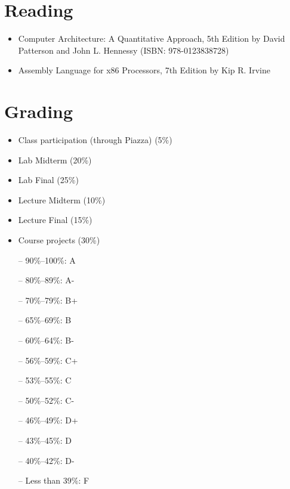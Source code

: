 \documentclass[12pt,a4paper,oneside]{article}
\begin{document}
    \section{Reading}

        \begin{itemize}
            \item Computer Architecture: A Quantitative Approach, 5th Edition by David Patterson and John L. Hennessy (ISBN: 978-0123838728)
            \item Assembly Language for x86 Processors, 7th Edition by Kip R. Irvine
        \end{itemize}

    \section{Grading}

        \begin{itemize}
            \item Class participation (through Piazza) (5\%)
            \item Lab Midterm (20\%)
            \item Lab Final (25\%)
            \item Lecture Midterm (10\%)
            \item Lecture Final (15\%)
            \item Course projects (30\%)
        \end{itemize}

        \begin{itemize} \itemsep-10pt \parskip0pt 
            \item[--] 90\%--100\%: A\\
            \item[--] 80\%--89\%: A-\\
            \item[--] 70\%--79\%: B+\\
            \item[--] 65\%--69\%: B\\
            \item[--] 60\%--64\%: B-\\
            \item[--] 56\%--59\%: C+\\
            \item[--] 53\%--55\%: C\\
            \item[--] 50\%--52\%: C-\\
            \item[--] 46\%--49\%: D+\\
            \item[--] 43\%--45\%: D\\
            \item[--] 40\%--42\%: D-\\
            \item[--] Less than 39\%: F
        \end{itemize}
\end{document}
